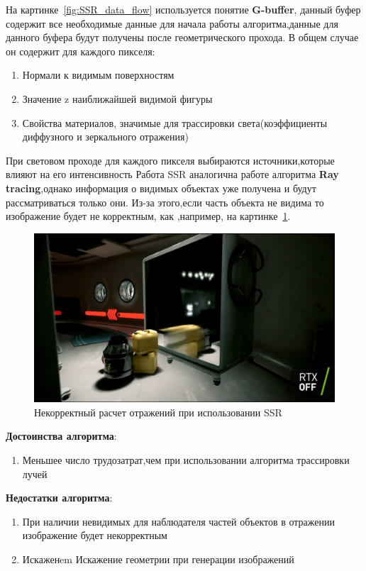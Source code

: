 \documentclass[a4paper,14pt,unknownkeysallowed]{extreport}
\begin{document}
На картинке~\ref{fig:SSR_data_flow} используется понятие \textbf{G-buffer}, данный буфер содержит все необходимые данные для начала работы алгоритма,данные для данного буфера
будут получены после геометрического прохода. В общем случае он содержит для каждого пикселя:
\begin{enumerate}
	\item Нормали к видимым поверхностям
	\item Значение z наиближайшей видимой фигуры
	\item Свойства материалов, значимые для трассировки света(коэффициенты диффузного и зеркального отражения)
\end{enumerate}
При световом проходе для каждого пикселя выбираются источники,которые влияют на его интенсивность
Работа SSR аналогична работе алгоритма \textbf{Ray tracing},однако информация о видимых объектах уже получена и будут рассматриваться только они.
Из-за этого,если часть объекта не видима то изображение будет не корректным, как ,например, на картинке~\ref{fig:SSR_fail}.\cite{SSR,reflexion_types}
\begin{figure}[H]
	\centering
	\includegraphics[scale=0.4]{SSR_fail.jpg}
	\caption{Некорректный расчет отражений при использовании SSR}
	\label{fig:SSR_fail}
\end{figure} 

\textbf{Достоинства алгоритма}:
\begin{enumerate}
	\item Меньшее число трудозатрат,чем при использовании алгоритма трассировки лучей \cite{SSR}
\end{enumerate}

\textbf{Недостатки алгоритма}:
\begin{enumerate}
	\item При наличии невидимых для наблюдателя частей объектов в отражении изображение будет некорректным \cite{SSR}
	\item Искаженem Искажение геометрии при генерации изображений \cite{SSR}
\end{enumerate}
\end{document}
